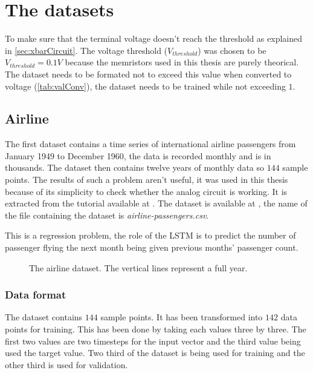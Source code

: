 \section{The datasets}\label{sec:dataset}

To make sure that the terminal voltage doesn't reach the threshold as explained in \cref{sec:xbarCircuit}. The voltage threshold ($V_{threshold}$) was chosen to be $V_{threshold}=0.1V$ because the memristors used in this thesis are purely theorical. The dataset needs to be formated not to exceed this value when converted to voltage (\cref{tab:valConv}), the dataset needs to be trained while not exceeding $1$.

\subsection{Airline}

The first dataset contains a time series of international airline passengers from January 1949 to December 1960, the data is recorded monthly and is in thousands. The dataset then contains twelve years of monthly data so $144$ sample points. The results of such a problem aren't useful, it was used in this thesis because of its simplicity to check whether the analog circuit is working. It is extracted from the tutorial available at \cite{airline}. The dataset is available at \cite{datasets}, the name of the file containing the dataset is \textit{airline-passengers.csv}.

This is a regression problem, the role of the \ac{LSTM} is to predict the number of passenger flying the next month being given previous months' passenger count.

\begin{figure}[H]
  \centering
  
  \caption{The airline dataset. The vertical lines represent a full year.}
  \label{graph:airline}
\end{figure}

\subsubsection{Data format}

The dataset contains $144$ sample points. It has been transformed into $142$ data points for training. This has been done by taking each values three by three. The first two values are two timesteps for the input vector and the third value being used the target value. Two third of the dataset is being used for training and the other third is used for validation.

